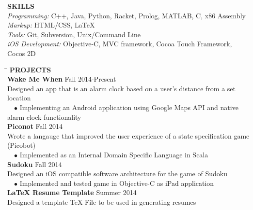 \documentclass[11pt]{article}
\newcommand{\sectionNL}{\\[-2pt]}
\newcommand{\customtab}{$\hspace{10pt} \bullet \hspace{2pt}$}
\newcommand{\JudgeNudge}{\hspace{4pt}}
\begin{document}
\begin{flushleft}
{\textbf{SKILLS}} \sectionNL
\textit{Programming:} C++, Java, Python, Racket, Prolog, MATLAB, C, x86 Assembly\\
\textit{Markup:} HTML/CSS, LaTeX \\
\textit{Tools:} Git, Subversion, Unix/Command Line \\
\textit{iOS Development:} Objective-C, MVC framework, Cocoa Touch Framework, Cocos 2D %
\end{flushleft}

\begin{tabbing} 
\hspace*{6.5in}\= \kill
{\textbf{PROJECTS} } \> \sectionNL

\textbf{Wake Me When} \>Fall 2014-Present \\
\JudgeNudge Designed an app that is an alarm clock based on a user's distance from a set location \\
\customtab Implementing an Android application using Google Maps API and native alarm clock functionality \\

\textbf{Piconot} \>Fall 2014 \\
\JudgeNudge Wrote a langauge that improved the user experience of a state specification game (Picobot) \\
\customtab Implemented as an Internal Domain Specific Language in Scala \\
 
\textbf{Sudoku} \>Fall 2014 \\
\JudgeNudge Designed an iOS compatible software architecture for the game of Sudoku \\
\customtab Implemented and tested game in Objective-C as iPad application \\

\textbf{LaTeX Resume Template} \>Summer 2014 \\
\JudgeNudge Designed a template TeX File to be used in generating resumes
\end{tabbing} 
\end{document}

